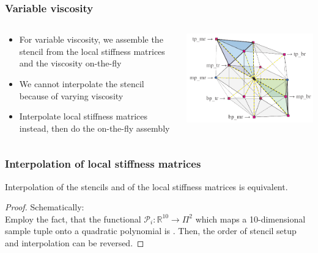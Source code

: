 \documentclass[t,compress=false,usepdftitle=false]{beamer}
\def\RR{\mathbb{R}}
\def\P{\mathcal{P}}
\begin{document}
\begin{frame}\frametitle{Variable viscosity}
\begin{columns}
\vspace*{-2mm}
\begin{myColorBox}{.9}{}\color{linkcolor}
\centering
\begin{itemize}
 \item For variable viscosity, we assemble the stencil from the local stiffness matrices and the viscosity on-the-fly
 \item We cannot interpolate the stencil because of varying viscosity
 \item Interpolate local stiffness matrices instead, then do the on-the-fly assembly
\end{itemize}
\end{myColorBox}
\includegraphics[width=.95\textwidth]{stencil.png}\\
\end{columns}
\end{frame}

%
%
\begin{frame}\frametitle{Interpolation of local stiffness matrices}


\begin{theorem}
Interpolation of the stencils and of the local stiffness matrices is equivalent.
\end{theorem}

\begin{proof}
Schematically:\\
Employ the fact, that the functional
$\P_i : \RR^{10} \rightarrow \Pi^2$ which maps a
10-dimensional sample tuple 
onto a quadratic polynomial is .
Then, the order of stencil setup and interpolation 
can be reversed.
\end{proof}


\end{frame}
\end{document}
